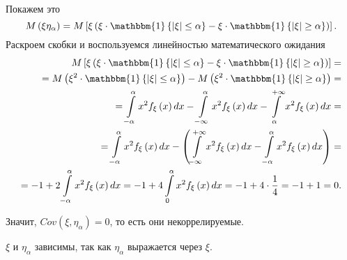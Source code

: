 Покажем это
$$M \left( \xi \eta_{ \alpha } \right) =
  M \left[
    \xi \left(
      \xi \cdot \mathbbm{1} \left\{ \left| \xi \right| \leq \alpha \right\} -
      \xi \cdot \mathbbm{1} \left\{ \left| \xi \right| \geq \alpha \right\}
    \right)
  \right].$$
Раскроем скобки и воспользуемся линейностью математического ожидания
\begin{equation*}
  \begin{split}
    M \left[
    \xi \left(
        \xi \cdot \mathbbm{1} \left\{ \left| \xi \right| \leq \alpha \right\} -
        \xi \cdot \mathbbm{1} \left\{ \left| \xi \right| \geq \alpha \right\}
      \right)
    \right] = \\
    = M \left( \xi^2 \cdot \mathbbm{1} \left\{ \left| \xi \right| \leq \alpha \right\} \right) -
    M \left( \xi^2 \cdot \mathbbm{1} \left\{ \left| \xi \right| \geq \alpha \right\} \right) = \\
    = \int \limits_{- \alpha }^{ \alpha } x^2 f_{ \xi } \left( x \right) dx -
    \int \limits_{- \infty }^{ \alpha } x^2 f_{ \xi } \left( x \right) dx -
    \int \limits_{ \alpha }^{+ \infty } x^2 f_{ \xi } \left( x \right) dx = \\
    = \int \limits_{- \alpha }^{ \alpha } x^2 f_{ \xi } \left( x \right) dx - \left(
      \int \limits_{- \infty }^{+ \infty } x^2 f_{ \xi } \left( x \right) dx -
      \int \limits_{- \alpha }^{ \alpha } x^2 f_{ \xi } \left( x \right) dx
    \right) = \\
    = -1 + 2 \int \limits_{- \alpha }^{ \alpha } x^2 f_{ \xi } \left( x \right) dx =
    -1 + 4 \int \limits_0^{ \alpha } x^2 f_{ \xi } \left( x \right) dx =
    -1 + 4 \cdot \frac{1}{4} =
    -1 + 1 =
    0.
  \end{split}
\end{equation*}

Значит, $Cov \left( \xi, \eta_{ \alpha } \right) = 0$, то есть они некоррелируемые.

$ \xi $ и $ \eta_{ \alpha }$ зависимы, так как $ \eta_{ \alpha }$ выражается через $ \xi $.
